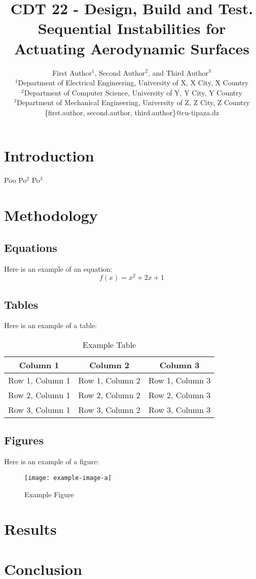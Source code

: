 \documentclass{IEEEtran}
\title{CDT 22 - Design, Build and Test. Sequential Instabilities for Actuating Aerodynamic Surfaces}
\author{First Author$^1$, Second Author$^2$, and Third Author$^3$\\
	$^1$Department of Electrical Engineering, University of X, X City, X Country\\
	$^2$Department of Computer Science, University of Y, Y City, Y Country\\
	$^3$Department of Mechanical Engineering, University of Z, Z City, Z Country\\
	\{first.author, second.author, third.author\}@cu-tipaza.dz}
\begin{document}
	\maketitle
	
	\begin{abstract}
		
	\end{abstract}
	
	\section{Introduction}
	Poo \cite{Guest2006}
	Po$^2$
	Po$^3$
	\section{Methodology}
	
	
	\subsection{Equations}
	Here is an example of an equation:
	\begin{equation}
		f(x) = x^2 + 2x + 1
	\end{equation}
	
	\subsection{Tables}
	Here is an example of a table:
	\begin{table}[htbp]
		\centering
		\caption{Example Table}
		\label{tab:example}
		\begin{tabular}{|c|c|c|}
			\hline
			\textbf{Column 1} & \textbf{Column 2} & \textbf{Column 3} \\
			\hline
			Row 1, Column 1 & Row 1, Column 2 & Row 1, Column 3 \\
			\hline
			Row 2, Column 1 & Row 2, Column 2 & Row 2, Column 3 \\
			\hline
			Row 3, Column 1 & Row 3, Column 2 & Row 3, Column 3 \\
			\hline
		\end{tabular}
	\end{table}
	
	\subsection{Figures}
	Here is an example of a figure:
	\begin{figure}[htbp]
		\centering
		\texttt{[image: example-image-a]}
		\caption{Example Figure}
		\label{fig:example}
	\end{figure}
	
	\section{Results}
	
	\section{Conclusion}
	
	
    \printbibliography
	
\end{document}
